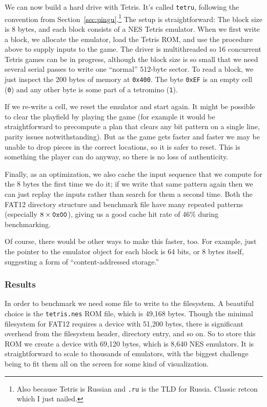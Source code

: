 \documentclass[twocolumn]{article}
\begin{document}
We can now build a hard drive with Tetris. It's called {\tt tetru},
following the convention from Section~\ref{sec:pingu}.\footnote{Also
  because Tetris is Russian and {\tt .ru} is the TLD for Russia.
  Classic retcon which I just nailed.} The setup is straightforward:
The block size is 8 bytes, and each block consists of a NES Tetris
emulator. When we first write a block, we allocate the emulator, load
the Tetris ROM, and use the procedure above to supply inputs to the
game. The driver is multithreaded so 16 concurrent Tetris games can be
in progress, although the block size is so small that we need several
serial passes to write one ``normal'' 512-byte sector. To read a
block, we just inspect the 200 bytes of memory at {\tt 0x400}.
The byte {\tt 0xEF} is an empty cell ({\tt 0}) and any other byte is some
part of a tetromino ({\tt 1}).

If we re-write a cell, we reset the emulator and start again. It might
be possible to clear the playfield by playing the game (for example it
would be straightforward to precompute a plan that clears any bit
pattern on a single line, parity issues notwithstanding). But as the
game gets faster and faster we may be unable to drop pieces in the
correct locations, so it is safer to reset. This is something the
player can do anyway, so there is no loss of authenticity.

Finally, as an optimization, we also cache the input sequence that we
compute for the 8 bytes the first time we do it; if we write that same
pattern again then we can just replay the inputs rather than search
for them a second time. Both the FAT12 directory structure and benchmark
file have many repeated patterns (especially $8 \times {\tt 0x00}$),
giving us a good cache hit rate of 46\% during benchmarking.

Of course, there would be other ways to make this faster, too. For
example, just the pointer to the emulator object for each block is 64
bits, or 8 bytes itself, suggesting a form of ``content-addressed
storage.''

\subsubsection{Results}

In order to benchmark we need some file to write to the filesystem. A
beautiful choice is the {\tt tetris.nes} ROM file, which is 49,168
bytes. Though the minimal filesystem for FAT12 requires a device with
51,200 bytes, there is significant overhead from the filesystem
header, directory entry, and so on. So to store this ROM we create a
device with 69,120 bytes, which is 8,640 NES emulators. It is
straightforward to scale to thousands of emulators, with the biggest
challenge being to fit them all on the screen for some kind of
visualization.
\end{document}
